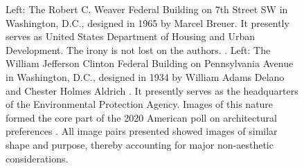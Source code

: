 \documentclass{article}
\begin{document}
\begin{figure}[ht!]
    \centering
    \caption{Left: The Robert C. Weaver Federal Building on 7th Street SW in Washington, D.C., designed in 1965 by Marcel Breuer. It presently serves as United States Department of Housing and Urban Development. The irony is not lost on the authors. \cite{highsmith_robert_2012}. Left: The William Jefferson Clinton Federal Building on Pennsylvania Avenue in Washington, D.C., designed in 1934 by William Adams Delano and Chester Holmes Aldrich \cite{wikimedia_commons_user_moreau1_epa_2018}. It presently serves as the headquarters of the Environmental Protection Agency. Images of this nature formed the core part of the 2020 American poll on architectural preferences \cite{noauthor_americans_2020}. All image pairs presented showed images of similar shape and purpose, thereby accounting for major non-aesthetic considerations.}
    \label{fig:federal_buildings}
\end{figure}
\end{document}
